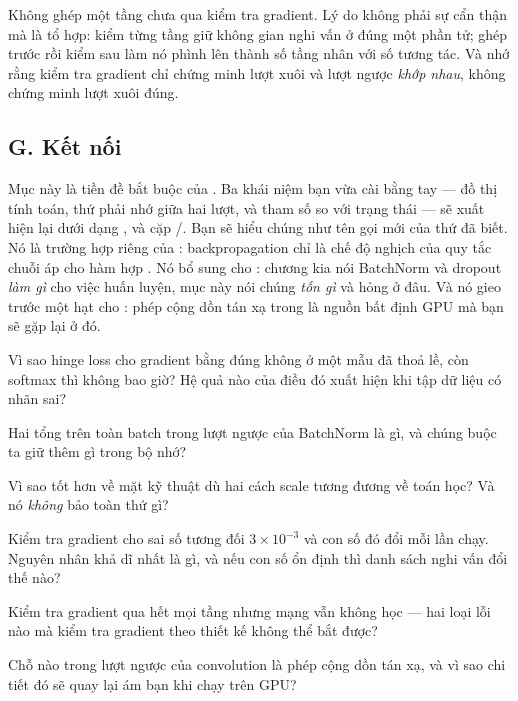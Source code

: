 \documentclass[../../../deep_learning.tex]{subfiles}
\begin{document}
\begin{cannho}
Không ghép một tầng chưa qua kiểm tra gradient. Lý do không phải sự cẩn thận mà là tổ hợp: kiểm từng tầng giữ không gian nghi vấn ở đúng một phần tử; ghép trước rồi kiểm sau làm nó phình lên thành số tầng nhân với số tương tác. Và nhớ rằng kiểm tra gradient chỉ chứng minh lượt xuôi và lượt ngược \emph{khớp nhau}, không chứng minh lượt xuôi đúng. 
\end{cannho}

\subsection{G. Kết nối}
Mục này là tiền đề bắt buộc của . Ba khái niệm bạn vừa cài bằng tay --- đồ thị tính toán, thứ phải nhớ giữa hai lượt, và tham số so với trạng thái --- sẽ xuất hiện lại dưới dạng ,  và cặp /. Bạn sẽ hiểu chúng như tên gọi mới của thứ đã biết. Nó là trường hợp riêng của : backpropagation chỉ là chế độ nghịch của quy tắc chuỗi áp cho hàm hợp \cite{rumelhart1986}. Nó bổ sung cho : chương kia nói BatchNorm và dropout \emph{làm gì} cho việc huấn luyện, mục này nói chúng \emph{tốn gì} và hỏng ở đâu. Và nó gieo trước một hạt cho : phép cộng dồn tán xạ trong  là nguồn bất định GPU mà bạn sẽ gặp lại ở đó.

\begin{tukiem}
\item Vì sao hinge loss cho gradient bằng đúng không ở một mẫu đã thoả lề, còn softmax thì không bao giờ? Hệ quả nào của điều đó xuất hiện khi tập dữ liệu có nhãn sai?
\item Hai tổng trên toàn batch trong lượt ngược của BatchNorm là gì, và chúng buộc ta giữ thêm gì trong bộ nhớ?
\item Vì sao  tốt hơn về mặt kỹ thuật dù hai cách scale tương đương về toán học? Và nó \emph{không} bảo toàn thứ gì?
\item Kiểm tra gradient cho sai số tương đối $3{\times}10^{-3}$ và con số đó đổi mỗi lần chạy. Nguyên nhân khả dĩ nhất là gì, và nếu con số ổn định thì danh sách nghi vấn đổi thế nào?
\item Kiểm tra gradient qua hết mọi tầng nhưng mạng vẫn không học --- hai loại lỗi nào mà kiểm tra gradient theo thiết kế không thể bắt được?
\item Chỗ nào trong lượt ngược của convolution là phép cộng dồn tán xạ, và vì sao chi tiết đó sẽ quay lại ám bạn khi chạy trên GPU?
\end{tukiem}
\ifSubfilesClassLoaded{\printbibliography[title={Nguồn}]}{}
\end{document}
